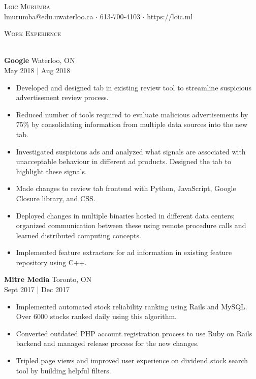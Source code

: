 \documentclass[a4paper]{article}
\newcommand{\lineunder} {
    \vspace*{-8pt} \\
    \hspace*{-18pt} \hrulefill \\
}
\newcommand{\header} [1] {
    {\hspace*{-18pt}\vspace*{6pt} \textsc{#1}}
    \vspace*{-6pt} \lineunder
}
\begin{document}
\vspace*{-40pt}

\vspace*{-10pt}
\begin{center}
	{\Huge \scshape {Loïc Murumba}}\\
	lmurumba@edu.uwaterloo.ca $\cdot$ 613-700-4103 $\cdot$ https://loic.ml\\
\end{center}

\header{Work Experience}
\vspace{1mm}

\textbf{Google} \hfill Waterloo, ON\\
 \hfill May 2018 | Aug 2018\\
\vspace{-1mm}
\begin{itemize} \itemsep 1pt
	\item Developed and designed tab in existing review tool to streamline suspicious advertisement review process.
	\item Reduced number of tools required to evaluate malicious advertisements by 75\% by consolidating information from multiple data sources into the new tab.
	\item Investigated suspicious ads and analyzed what signals are associated with unacceptable behaviour in different ad products. Designed the tab to highlight these signals.
	\item Made changes to review tab frontend with Python, JavaScript, Google Closure library, and CSS.
	\item Deployed changes in multiple binaries hosted in different data centers; organized communication between these using remote procedure calls and learned distributed computing concepts.
	\item Implemented feature extractors for ad information in existing feature repository using C++.
\end{itemize}

\textbf{Mitre Media} \hfill Toronto, ON\\
 \hfill Sept 2017 | Dec 2017\\
\vspace{-1mm}
\begin{itemize} \itemsep 1pt
	\item Implemented automated stock reliability ranking using Rails and MySQL. Over 6000 stocks ranked daily using this algorithm.
	\item Converted outdated PHP account registration process to use Ruby on Rails backend and managed release process for the new changes.
	\item Tripled page views and improved user experience on dividend stock search tool by building helpful filters.
\end{itemize}
\end{document}
